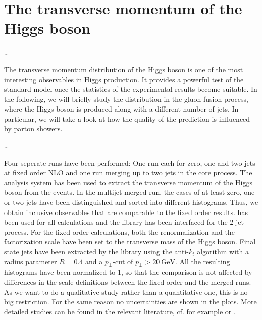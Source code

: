 \section{The transverse momentum of the Higgs boson}
\ldots

The transverse momentum distribution of the Higgs boson is one of the most interesting observables in Higgs production.
It provides a powerful test of the standard model once the statistics of the experimental results become suitable.
In the following, we will briefly study the distribution in the gluon fusion process, where the Higgs boson is produced along with a different number of jets.
In particular, we will take a look at how the quality of the prediction is influenced by parton showers.

\ldots

Four seperate runs have been performed: One run each for zero, one and two jets at fixed order NLO and one \mcatnlo{} run merging up to two jets in the core process.
The \rivet{} analysis system has been used to extract the transverse momentum of the Higgs boson from the events.
In the multijet merged run, the cases of at least zero, one or two jets have been distinguished and sorted into different histograms.
Thus, we obtain inclusive observables that are comparable to the fixed order results.
\sherpa{} has been used for all calculations and the \mcfm{} library \cite{mcfm_hjj} has been interfaced for the 2-jet process.
For the fixed order calculations, both the renormalization and the factorization scale have been set to the transverse mass of the Higgs boson.
Final state jets have been extracted by the \fastjet{} library \cite{fastjet_manual} using the anti-$k_t$ algorithm \cite{anti_kt} with a radius parameter $R=0.4$ and a $p_\perp$-cut of $p_\perp > \SI{20}{\giga\electronvolt}$.
All the resulting histograms have been normalized to \num{1}, so that the comparison is not affected by differences in the scale definitions between the fixed order and the merged runs.
As we want to do a qualitative study rather than a quantitative one, this is no big restriction.
For the same reason no uncertainties are shown in the plots.
More detailed studies can be found in the relevant literature, cf. for example \cite{symmetrybreaking1,symmetrybreaking2} or \cite{higgshandbook1,higgshandbook2,higgshandbook3}.


